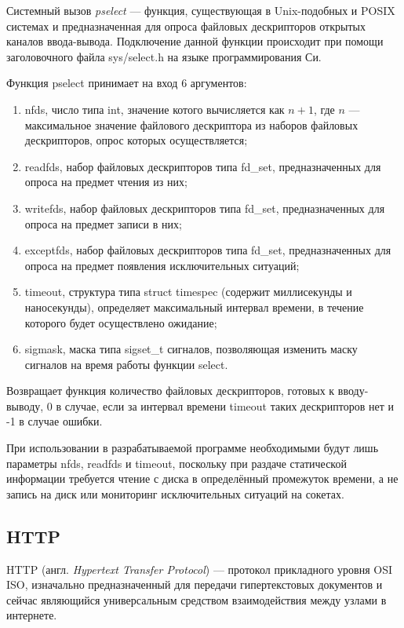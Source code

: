 Системный вызов \textit{pselect} --- функция, существующая в Unix-подобных и POSIX системах и предназначенная для опроса файловых дескрипторов открытых каналов ввода-вывода. Подключение данной функции происходит при помощи заголовочного файла sys/select.h на языке программирования Си.

Функция pselect принимает на вход 6 аргументов: 

\begin{enumerate}[label=\arabic*)]
	\item nfds, число типа int, значение котого вычисляется как $n + 1$, где $n$ --- максимальное значение файлового дескриптора из наборов файловых дескрипторов, опрос которых осуществляется;
	\item readfds, набор файловых дескрипторов типа fd\_set, предназначенных для опроса на предмет чтения из них;
	\item writefds, набор файловых дескрипторов типа fd\_set, предназначенных для опроса на предмет записи в них;
	\item exceptfds, набор файловых дескрипторов типа fd\_set, предназначенных для опроса на предмет появления исключительных ситуаций;
	\item timeout, структура типа struct timespec (содержит миллисекунды и наносекунды), определяет максимальный интервал времени, в течение которого будет осуществлено ожидание;
	\item sigmask, маска типа sigset\_t сигналов, позволяющая изменить маску сигналов на время работы функции select.
\end{enumerate}

Возвращает функция количество файловых дескрипторов, готовых к вводу-выводу, 0 в случае, если за интервал времени timeout таких дескрипторов нет и -1 в случае ошибки.

При использовании в разрабатываемой программе необходимыми будут лишь параметры nfds, readfds и timeout, поскольку при раздаче статической информации требуется чтение с диска в определённый промежуток времени, а не запись на диск или мониторинг исключительных ситуаций на сокетах.

\subsection{HTTP}

HTTP (англ. \textit{Hypertext Transfer Protocol}) --- протокол прикладного уровня OSI ISO, изначально предназначенный для передачи гипертекстовых документов и сейчас являющийся универсальным средством взаимодействия между узлами в интернете. 

